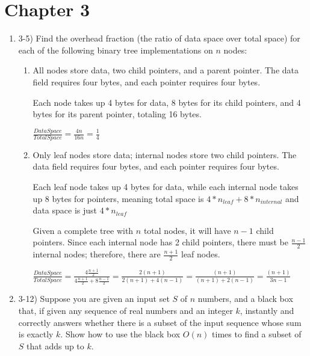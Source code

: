 \documentclass{article}
\begin{document}
\section{Chapter 3}
\begin{enumerate}
    \item 3-5) Find the overhead fraction (the ratio of data space over total space) for each of the following binary tree implementations on $n$ nodes:
    \begin{enumerate}
        \item All nodes store data, two child pointers, and a parent pointer. The data field requires four bytes, and each pointer requires four bytes. 
        
        Each node takes up 4 bytes for data, 8 bytes for its child pointers, and 4 bytes for its parent pointer, totaling 16 bytes.
        
        $\frac{DataSpace}{TotalSpace}=\frac{4n}{16n}=\boxed{\frac{1}{4}}$
        
        \item Only leaf nodes store data; internal nodes store two child pointers. The data field requires four bytes, and each pointer requires four bytes.

        Each leaf node takes up 4 bytes for data, while each internal node takes up 8 bytes for pointers, meaning total space is $4*n_{leaf} + 8*n_{internal}$ and data space is just $4*n_{leaf}$ 

        Given a complete tree with $n$ total nodes, it will have $n-1$ child pointers. Since each internal node has 2 child pointers, there must be $\frac{n-1}{2}$ internal nodes; therefore, there are $\frac{n+1}{2}$ leaf nodes.

        $\frac{DataSpace}{TotalSpace}=\frac{4\frac{n+1}{2}}{4\frac{n+1}{2}+8\frac{n-1}{2}}=\frac{2(n+1)}{2(n+1)+4(n-1)}=\frac{(n+1)}{(n+1)+2(n-1)}=\boxed{\frac{(n+1)}{3n-1}}$
        
    \end{enumerate}
    \item 3-12) Suppose you are given an input set $S$ of $n$ numbers, and a black box that, if given any sequence of real numbers and an integer $k$, instantly and correctly answers whether there is a subset of the input sequence whose sum is exactly $k$. Show how to use the black box $O(n)$ times to find a subset of $S$ that adds up to $k$.
    
    

\end{enumerate}
\end{document}
